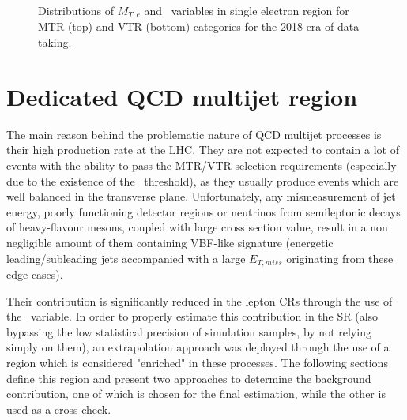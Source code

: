 \begin{figure}[htbp]
{    }
  \caption{Distributions of $M_{T,e}$ and \mindphinoe~variables in single electron region for MTR (top) and VTR (bottom) categories for the 2018 era of data taking.}
  \label{fig:2018_Wenu_2}
\end{figure}





\section{Dedicated QCD multijet region}

\hspace{10pt} The main reason behind the problematic nature of QCD multijet processes is their high production rate at the LHC. They are not expected to contain a lot of events with the ability to pass the MTR/VTR selection requirements (especially due to the existence of the \mindphi~threshold), as they usually produce events which are well balanced in the transverse plane. Unfortunately, any mismeasurement of jet energy, poorly functioning detector regions or neutrinos from semileptonic decays of heavy-flavour mesons, coupled with large cross section value, result in a non negligible amount of them containing VBF-like signature (energetic leading/subleading jets accompanied with a large $E_{T,miss}$ originating from these edge cases). 

\hspace{10pt} Their contribution is significantly reduced in the lepton CRs through the use of the \mindphi~variable. In order to properly estimate this contribution in the SR (also bypassing the low statistical precision of simulation samples, by not relying simply on them), an extrapolation approach was deployed through the use of a region which is considered "enriched" in these processes. The following sections define this region and present two approaches to determine the background contribution, one of which is chosen for the final estimation, while the other is used as a cross check.

